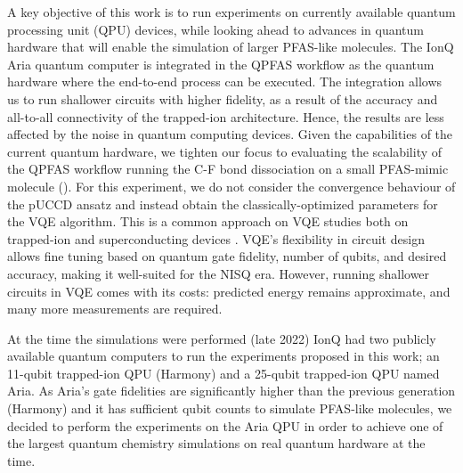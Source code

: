 \documentclass[journal,onecolumn]{IEEEtran}
\begin{document}
A key objective of this work is to run experiments on currently available quantum processing unit (QPU) devices, while looking ahead to advances in quantum hardware that will enable the simulation of larger  PFAS-like molecules. 
%
The IonQ Aria quantum computer is integrated in the QPFAS workflow as the quantum hardware where the end-to-end process can be executed. 
%
The integration allows us to run shallower circuits with higher fidelity, as a result of the accuracy and all-to-all connectivity of the trapped-ion architecture.
Hence, the results are less affected by the noise in quantum computing devices. 
%
Given the capabilities of the current quantum hardware, we tighten our focus to evaluating the scalability of the QPFAS workflow running the C-F bond dissociation on a small PFAS-mimic molecule (). 
%
For this experiment, we do not consider the convergence behaviour of the pUCCD ansatz and instead obtain the classically-optimized parameters for the VQE algorithm. 
This is a common approach on VQE studies both on trapped-ion\cite{Khan2022-cu, Zhao2023-um} and superconducting devices \cite{OBrien2022-aa}.
VQE’s flexibility in circuit design allows fine tuning based on quantum gate fidelity, number of qubits, and desired accuracy, making it well-suited for the NISQ era.
However, running shallower circuits in VQE comes with its costs: predicted energy remains approximate, and many more measurements are required. 


At the time the simulations were performed (late 2022) IonQ had two publicly available quantum computers to run the experiments proposed in this work; an 11-qubit trapped-ion QPU (Harmony) and a 25-qubit trapped-ion QPU named Aria. 
%
As Aria's gate fidelities are significantly higher than the previous generation (Harmony) and it has sufficient qubit counts to simulate PFAS-like molecules, we decided to perform the experiments on the Aria QPU in order to achieve one of the largest quantum chemistry simulations on real quantum hardware at the time. 
\end{document}
